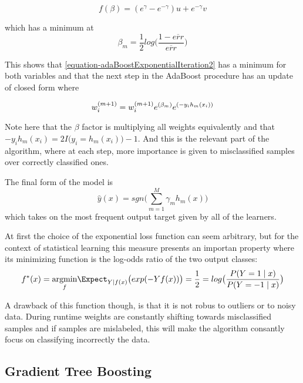  \begin{equation} \label{equation-adaBoostBetaMinimization}
f(\beta) = ( e^{\gamma} - e^{-\gamma}) u +  e^{-\gamma}v
\end{equation}

which has a minimum at 
\begin{equation}
\beta_{m} = \frac{1}{2} log\big( \frac{1 - \overline{err} }{ \overline{err} }  \big)
\end{equation}

This shows that \ref{equation-adaBoostExponentialIteration2} has a minimum for both variables and that the next step in the AdaBoost procedure has an update of closed form where

\begin{equation}
 w_i^{(m+1)} =   w_i^{(m+1)} e^{(\beta_m)} e^{(-y_i h_m(x_i))} \\
 \end{equation} 
 
Note here that the $\beta$ factor is multiplying all weights equivalently and that $-y_i h_m(x_i) = 2I \big( y_i = h_m(x_i)   \big) -1$. And this is the relevant part of the algorithm, where at each step, more importance is given to misclassified samples over correctly classified ones. 

The final form of the model is
$$  \hat{y}(x) = sgn\big(  \sum_{m=1}^{M} \gamma_m h_m(x) \big)$$ which takes on the most frequent output target given by all of the learners.

At first the choice of the exponential loss function can seem arbitrary, but for the context of statistical learning this measure presents an importan property where its minimizing function is the log-odds ratio of the two output classes:
$$f^*(x) = \underset{f}{\mathrm{argmin}} \Expect_{Y | f(x)}\big( exp(-Yf(x))  \big) = \frac{1}{2} =
log\big( \frac{ P(Y=1 \mid x) }{ P(Y=-1 \mid x) }  \big) $$

 A drawback of this function though, is that it is not robus to outliers or to noisy data. During runtime weights are constantly shifting towards misclassified samples and if samples are mislabeled, this will make the algorithm consantly focus on classifying incorrectly the data. 









\subsection{Gradient Tree Boosting}

